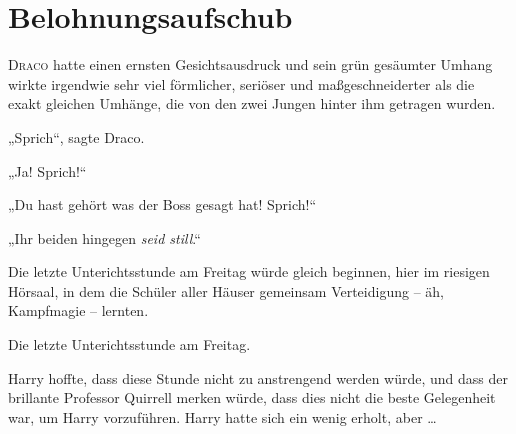 \chapter{Belohnungsaufschub}


\lettrine{D}{raco} hatte einen ernsten Gesichtsausdruck und sein grün gesäumter Umhang wirkte irgendwie sehr viel förmlicher, seriöser und maßgeschneiderter als die exakt gleichen Umhänge, die von den zwei Jungen hinter ihm getragen wurden.

„Sprich“, sagte Draco.

„Ja! Sprich!“

„Du hast gehört was der Boss gesagt hat! Sprich!“

„Ihr beiden hingegen \emph{seid still}.“

Die letzte Unterichtsstunde am Freitag würde gleich beginnen, hier im riesigen Hörsaal, in dem die Schüler aller Häuser gemeinsam Verteidigung – äh, Kampfmagie – lernten.

Die letzte Unterichtsstunde am Freitag.

Harry hoffte, dass diese Stunde nicht zu anstrengend werden würde, und dass der brillante Professor Quirrell merken würde, dass dies nicht die beste Gelegenheit war, um Harry vorzuführen. Harry hatte sich ein wenig erholt, aber …

